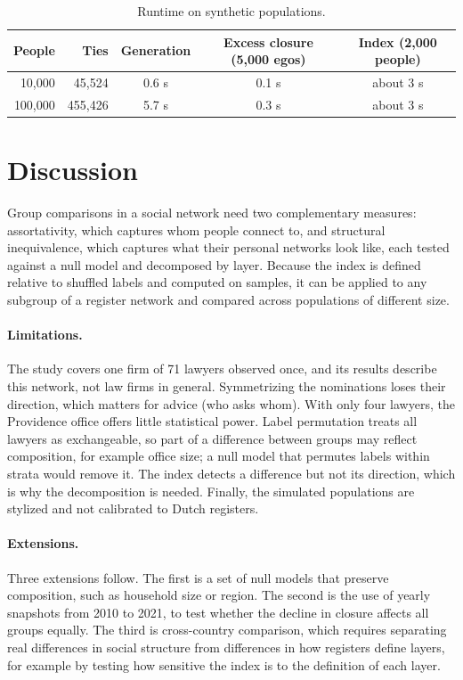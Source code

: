 \documentclass[11pt]{article}
\begin{document}
\begin{table}[h]
\centering\small
\caption{Runtime on synthetic populations.}
\label{tab:scale}
\begin{tabular}{rrccc}
\toprule
People & Ties & Generation & Excess closure (5,000 egos) & Index (2,000 people)\\
\midrule
10,000 & 45,524 & 0.6 s & 0.1 s & about 3 s\\
100,000 & 455,426 & 5.7 s & 0.3 s & about 3 s\\
\bottomrule
\end{tabular}
\end{table}

\section{Discussion}
Group comparisons in a social network need two complementary measures: assortativity, which captures whom people connect to, and structural inequivalence, which captures what their personal networks look like, each tested against a null model and decomposed by layer. Because the index is defined relative to shuffled labels and computed on samples, it can be applied to any subgroup of a register network and compared across populations of different size.

\paragraph{Limitations.} The study covers one firm of 71 lawyers observed once, and its results describe this network, not law firms in general. Symmetrizing the nominations loses their direction, which matters for advice (who asks whom). With only four lawyers, the Providence office offers little statistical power. Label permutation treats all lawyers as exchangeable, so part of a difference between groups may reflect composition, for example office size; a null model that permutes labels within strata would remove it. The index detects a difference but not its direction, which is why the decomposition is needed. Finally, the simulated populations are stylized and not calibrated to Dutch registers.

\paragraph{Extensions.} Three extensions follow. The first is a set of null models that preserve composition, such as household size or region. The second is the use of yearly snapshots from 2010 to 2021, to test whether the decline in closure affects all groups equally. The third is cross-country comparison, which requires separating real differences in social structure from differences in how registers define layers, for example by testing how sensitive the index is to the definition of each layer.
\end{document}

